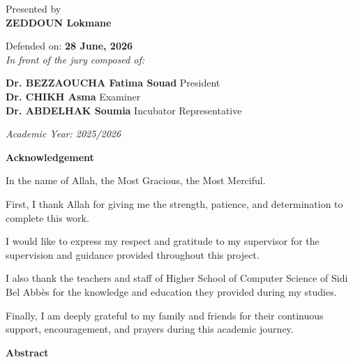 \documentclass[openany,12pt,oneside]{extreport}
\begin{document}
\begin{titlepage}
	\normalsize Presented by\\
	{\normalsize \textbf{ZEDDOUN Lokmane}}\\

	\vspace{0.2cm}

	{\normalsize Defended on: \textbf{28 June, 2026}}\\
	{\normalsize \textit{In front of the jury composed of:}}\\
	\vspace{0.2cm}
	\begin{center}
		{\normalsize \textbf{Dr. BEZZAOUCHA Fatima Souad} \hfill President} \\
		{\normalsize \textbf{Dr. CHIKH Asma} \hfill Examiner} \\
		{\normalsize \textbf{Dr. ABDELHAK Soumia} \hfill Incubator Representative} \\
	\end{center}

	\vspace{0.5cm}

	\normalsize \textit{Academic Year: 2025/2026}
\end{titlepage}


\newpage
\vspace*{4cm}
\begin{center}
	{\Large \bf Acknowledgement}
\end{center} \vskip 0.5cm \vskip 0.5cm

In the name of Allah, the Most Gracious, the Most Merciful.

First, I thank Allah for giving me the strength, patience, and determination to complete this work.

I would like to express my respect and gratitude to my supervisor for the supervision and guidance provided throughout this project.

I also thank the teachers and staff of Higher School of Computer Science of Sidi Bel Abbès for the knowledge and education they provided during my studies.

Finally, I am deeply grateful to my family and friends for their continuous support, encouragement, and prayers during this academic journey. \vskip 0.5cm

\newpage
\vspace*{3cm}
\begin{center}
	{\Large\bf Abstract}
\end{center} \vskip 1cm
\end{document}
